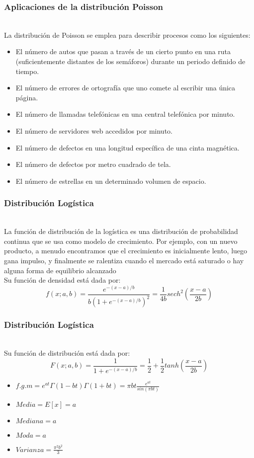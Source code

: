 \documentclass[12pt]{beamer}
\begin{document}
\begin{frame}
\frametitle{Aplicaciones de la distribución Poisson}
~\\La distribución de Poisson se emplea para describir procesos como los siguientes:  
\begin{itemize}
\item El número de autos que pasan a través de un cierto punto en una ruta (suficientemente
distantes de los semáforos) durante un periodo definido de tiempo.  
\item El número de errores de ortografía que uno comete al escribir una única página.  
\item El número de llamadas telefónicas en una central telefónica por minuto.  
\item El número de servidores web accedidos por minuto.  
\item El número de defectos en una longitud específica de una cinta magnética.   
\item El número de defectos por metro cuadrado de tela.
\item El número de estrellas en un determinado volumen de espacio.
\end{itemize}
\end{frame}
\begin{frame}
\frametitle{Distribución Logística}
~\\La función de distribución de la logística es una distribución de probabilidad continua que se usa como modelo de crecimiento. Por ejemplo,
con un nuevo producto, a menudo encontramos que el crecimiento es inicialmente lento, luego gana impulso,
y finalmente se ralentiza cuando el mercado está saturado o hay alguna forma de equilibrio
alcanzado
~\\ Su función de densidad está dada por:
$$f(x;a,b)=\frac{e^{-(x-a)/b}}{b(1+e^{-(x-a)/b})^2}=\frac{1}{4b}sech^2\left(\frac{x-a}{2b}\right)$$
\end{frame}

\begin{frame}
\frametitle{Distribución Logística}
~\\ Su función de distribución está dada por:
$$F(x;a,b)=\frac{1}{1+e^{-(x-a)/b}}=\frac{1}{2}+\frac{1}{2}tanh\left(\frac{x-a}{2b}\right)$$
\begin{itemize}
\item $f.g.m=e^{at}\Gamma(1-bt)\Gamma(1+bt)=\pi bt\frac{e^{at}}{sin(\pi bt)}$
\item $Media=E[x]=a$
\item $Mediana=a$
\item $Moda=a$
\item $Varianza=\frac{\pi^2 b^2}{3}$
\end{itemize}
\end{frame}
\end{document}
